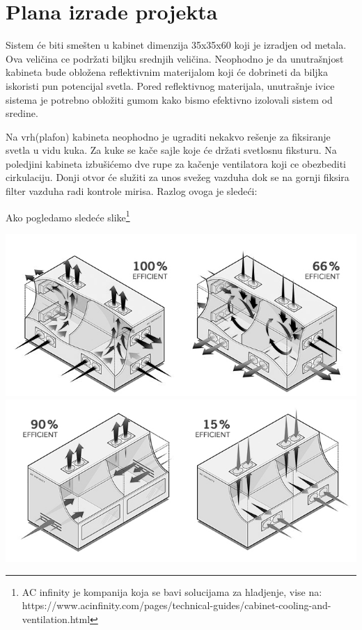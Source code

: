 \documentclass[a4paper,11pt]{book}
\begin{document}
\section{Plana izrade projekta}

Sistem će biti smešten u kabinet dimenzija 35x35x60 koji je izradjen od metala. Ova veličina ce podržati biljku srednjih veličina. Neophodno je da unutrašnjost kabineta bude obložena reflektivnim materijalom koji će dobrineti da biljka iskoristi pun potencijal svetla. Pored reflektivnog materijala, unutrašnje ivice sistema je potrebno obložiti gumom kako bismo efektivno izolovali sistem od sredine.

Na vrh(plafon) kabineta neophodno je ugraditi nekakvo rešenje za fiksiranje svetla u vidu kuka. Za kuke se kače sajle koje će držati svetlosnu fiksturu. Na poledjini kabineta izbušićemo dve rupe za kačenje ventilatora koji ce obezbediti cirkulaciju. Donji otvor će služiti za unos svežeg vazduha dok se na gornji fiksira filter vazduha radi kontrole mirisa. Razlog ovoga je sledeći:

Ako pogledamo sledeće slike\footnote{AC infinity je kompanija koja se bavi solucijama za hladjenje, vise na: https://www.acinfinity.com/pages/technical-guides/cabinet-cooling-and-ventilation.html}

\includegraphics[width=\textwidth]{10060.jpg}
\includegraphics[width=\textwidth]{9015.jpg}
\end{document}
